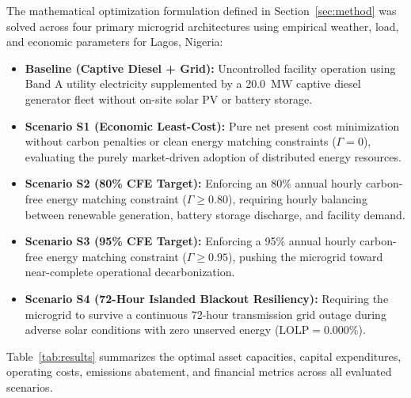 \documentclass[11pt,a4paper]{article}
\begin{document}
The mathematical optimization formulation defined in Section~\ref{sec:method} was solved across four primary microgrid architectures using empirical weather, load, and economic parameters for Lagos, Nigeria:
\begin{itemize}
    \item \textbf{Baseline (Captive Diesel + Grid):} Uncontrolled facility operation using Band A utility electricity supplemented by a 20.0~MW captive diesel generator fleet without on-site solar PV or battery storage.
    \item \textbf{Scenario S1 (Economic Least-Cost):} Pure net present cost minimization without carbon penalties or clean energy matching constraints ($\Gamma = 0$), evaluating the purely market-driven adoption of distributed energy resources.
    \item \textbf{Scenario S2 (80\% CFE Target):} Enforcing an 80\% annual hourly carbon-free energy matching constraint ($\Gamma \ge 0.80$), requiring hourly balancing between renewable generation, battery storage discharge, and facility demand.
    \item \textbf{Scenario S3 (95\% CFE Target):} Enforcing a 95\% annual hourly carbon-free energy matching constraint ($\Gamma \ge 0.95$), pushing the microgrid toward near-complete operational decarbonization.
    \item \textbf{Scenario S4 (72-Hour Islanded Blackout Resiliency):} Requiring the microgrid to survive a continuous 72-hour transmission grid outage during adverse solar conditions with zero unserved energy ($\text{LOLP}=0.000\%$).
\end{itemize}

Table~\ref{tab:results} summarizes the optimal asset capacities, capital expenditures, operating costs, emissions abatement, and financial metrics across all evaluated scenarios.
\end{document}
